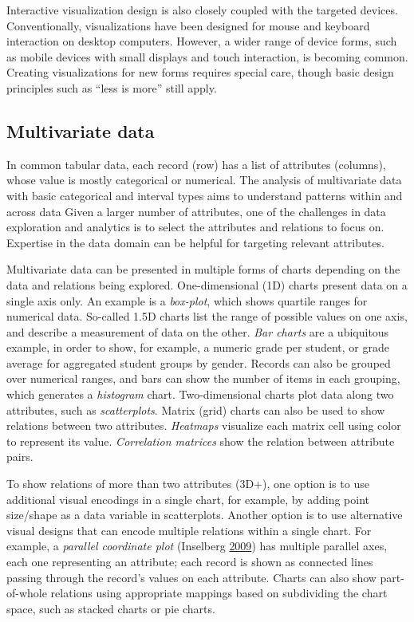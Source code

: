 \documentclass[]{krantz}
\begin{document}
Interactive visualization design is also closely coupled with the
targeted devices. Conventionally, visualizations have been designed for
mouse and keyboard interaction on desktop computers. However, a wider
range of device forms, such as mobile devices with small displays and
touch interaction, is becoming common. Creating visualizations for new
forms requires special care, though basic design principles such as
``less is more'' still apply.

\vspace*{-3pt}

\subsection{Multivariate data}\label{sec:viz-2.1}

In common tabular data, each record (row) has a list of attributes
(columns), whose value is mostly categorical or numerical. The analysis
of multivariate data with basic categorical and interval types aims to
understand patterns within and across data Given a larger number of
attributes, one of the challenges in data exploration and analytics is
to select the attributes and relations to focus on. Expertise in the
data domain can be helpful for targeting relevant attributes.

Multivariate data can be presented in multiple forms of charts depending
on the data and relations being explored. One-dimensional (1D) charts
present data on a single axis only. An example is a \emph{box-plot},
which shows quartile ranges for numerical data. So-called 1.5D charts
list the range of possible values on one axis, and describe a
measurement of data on the other. \emph{Bar charts} are a ubiquitous
example, in order to show, for example, a numeric grade per student, or
grade average for aggregated student groups by gender. Records can also
be grouped over numerical ranges, and bars can show the number of items
in each grouping, which generates a \emph{histogram} chart.
Two-dimensional charts plot data along two attributes, such as
\emph{scatterplots}. Matrix (grid) charts can also be used to show
relations between two attributes. \emph{Heatmaps} visualize each matrix
cell using color to represent its value. \emph{Correlation matrices}
show the relation between attribute pairs.

To show relations of more than two attributes (3D+), one option is to
use additional visual encodings in a single chart, for example, by
adding point size/shape as a data variable in scatterplots. Another
option is to use alternative visual designs that can encode multiple
relations within a single chart. For example, a \emph{parallel
coordinate plot} (Inselberg \protect\hyperlink{ref-inselberg2009}{2009})
has multiple parallel axes, each one representing an attribute; each
record is shown as connected lines passing through the record's values
on each attribute. Charts can also show part-of-whole relations using
appropriate mappings based on subdividing the chart space, such as
stacked charts or pie charts.
\end{document}
